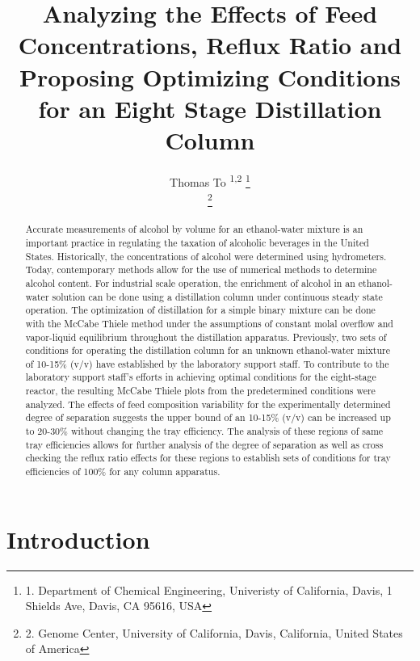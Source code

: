 \documentclass[peerreview, a4paper, 12pt]{IEEEtran}
\title{{\titleFontSize Analyzing the Effects of Feed Concentrations, Reflux Ratio and Proposing Optimizing Conditions for an Eight Stage Distillation Column}}
\author{Thomas To \textsuperscript{1,2} \thanks{1. Department of Chemical Engineering, Univeristy of California, Davis, 1 Shields Ave, Davis, CA 95616, USA}\\ \thanks{2. Genome Center, University of California, Davis, California, United States of America}}
\begin{document}
\maketitle  

\begin{abstract}
Accurate measurements of alcohol by volume for an ethanol-water mixture is an important practice in regulating the taxation of alcoholic beverages in the United States. Historically, the concentrations of alcohol were determined using hydrometers. Today, contemporary methods allow for the use of numerical methods to determine alcohol content. For industrial scale operation, the enrichment of alcohol in an ethanol-water solution can be done using a distillation column under continuous steady state operation. The optimization of distillation for a simple binary mixture can be done with the McCabe Thiele method under the assumptions of constant molal overflow and vapor-liquid equilibrium throughout the distillation apparatus. Previously, two sets of conditions for operating the distillation column for an unknown ethanol-water mixture of 10-15\% (v/v) have established by the laboratory support staff. To contribute to the laboratory support staff’s efforts in achieving optimal conditions for the eight-stage reactor, the resulting McCabe Thiele plots from the predetermined conditions were analyzed. The effects of feed composition variability for the experimentally determined degree of separation suggests the upper bound of an 10-15\% (v/v) can be increased up to 20-30\% without changing the tray efficiency. The analysis of these regions of same tray efficiencies allows for further analysis of the degree of separation as well as cross checking the reflux ratio effects for these regions to establish sets of conditions for tray efficiencies of 100\% for any column apparatus. 
\end{abstract}
\clearpage

\tableofcontents

\section{Introduction}
\end{document}
